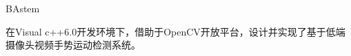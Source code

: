 
\begin{conclusion}{BAstem}

在Visual c++6.0开发环境下，借助于OpenCV开放平台，设计并实现了基于低端摄像头视频手势运动检测系统。

\end{conclusion}

